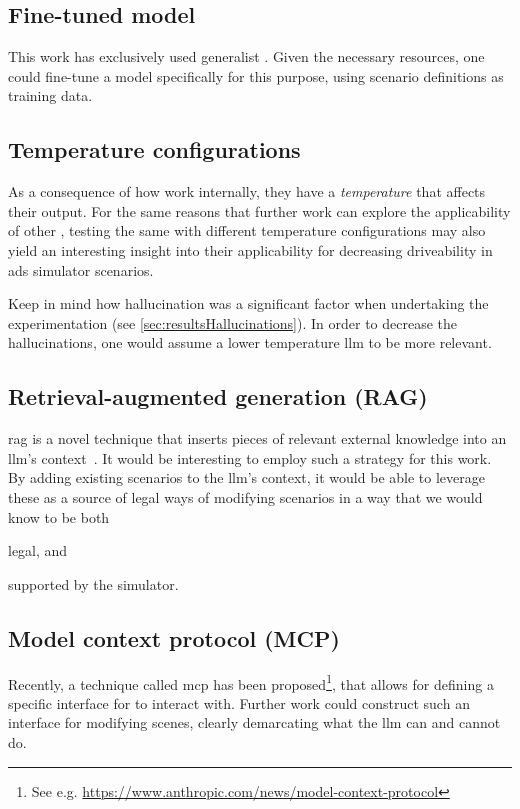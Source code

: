 \subsection{Fine-tuned model}

This work has exclusively used generalist . Given the necessary resources, one could
fine-tune a model specifically for this purpose, using scenario definitions as training data.

\subsection{Temperature configurations}
As a consequence of how  work internally, they have a \emph{temperature} that
affects their output. For the same reasons that further work can explore the applicability of other
, testing the same  with different temperature configurations may
also yield an interesting insight into their applicability for decreasing driveability in
\acrshort{ads} simulator scenarios.

Keep in mind how hallucination was a significant factor when undertaking the experimentation (see
\cref{sec:resultsHallucinations}). In order to decrease the hallucinations, one would assume a lower
temperature \acrshort{llm} to be more relevant.

\subsection{Retrieval-augmented generation (RAG)}

\acrfull{rag} is a novel technique that inserts pieces of relevant external knowledge into an
\acrshort{llm}'s context~\cite[88-89]{llmSurvey}. It would be interesting to employ such a strategy
for this work. By adding existing scenarios to the \acrfull{llm}'s context, it would be able to
leverage these as a source of legal ways of modifying scenarios in a way that we would know to be
both \begin{inparaenum}
    \item legal, and
    \item supported by the simulator.
\end{inparaenum}

\subsection{Model context protocol (MCP)}

Recently, a technique called \acrfull{mcp} has been proposed\footnote{See e.g.
    \url{https://www.anthropic.com/news/model-context-protocol}}, that allows for defining a specific
interface for  to interact with. Further work could construct such an interface for
modifying scenes, clearly demarcating what the \acrshort{llm} can and cannot do.

